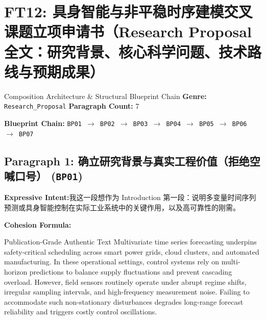 \section{FT12: 具身智能与非平稳时序建模交叉课题立项申请书（Research Proposal 全文：研究背景、核心科学问题、技术路线与预期成果）}\label{comp:FT12}
\begin{ConceptBox}{Composition Architecture \& Structural Blueprint Chain}
\textbf{Genre:} \texttt{Research\_Proposal} \quad \textbf{Paragraph Count:} 7\par
\textbf{Blueprint Chain:} \texttt{BP01 $\to$ BP02 $\to$ BP03 $\to$ BP04 $\to$ BP05 $\to$ BP06 $\to$ BP07}
\end{ConceptBox}
\subsection*{Paragraph 1: 确立研究背景与真实工程价值（拒绝空喊口号） (\texttt{BP01})}
\noindent\textbf{Expressive Intent:}\enspace 我这一段想作为 Introduction 第一段：说明多变量时间序列预测或具身智能控制在实际工业系统中的关键作用，以及高可靠性的刚需。\par
\noindent\textbf{Cohesion Formula:}\par\vspace{4pt}
\begin{ExampleBox}{Publication-Grade Authentic Text}
Multivariate time series forecasting underpins safety-critical scheduling across smart power grids, cloud clusters, and automated manufacturing. In these operational settings, control systems rely on multi-horizon predictions to balance supply fluctuations and prevent cascading overload. However, field sensors routinely operate under abrupt regime shifts, irregular sampling intervals, and high-frequency measurement noise. Failing to accommodate such non-stationary disturbances degrades long-range forecast reliability and triggers costly control oscillations.
\end{ExampleBox}
